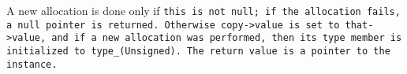 A new allocation is done only if \tt{this} is not null;
if the allocation fails, a null pointer is returned.
Otherwise \tt{copy->value} is set to \tt{that->value}, and if a new allocation
was performed, then its \tt{type} member is initialized to \tt{type_(Unsigned)}.
The return value is a pointer to the instance.
